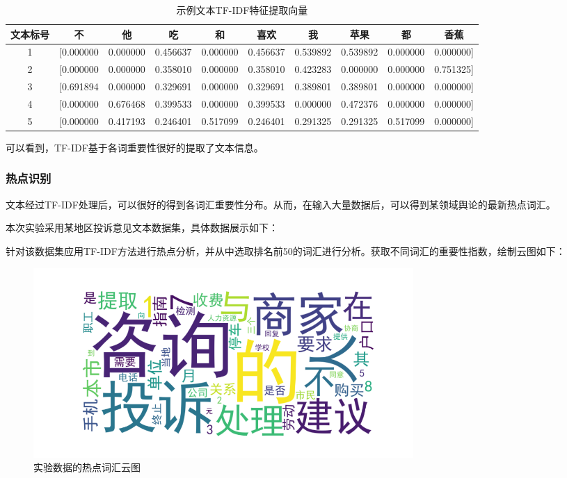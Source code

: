 \documentclass[UTF8,a4paper,15pt,titlepage,oneside]{ctexbook}
\begin{document}
  \begin{table}[H]
    \centering
    \begin{tabular}{cccccccccc}
    \toprule
    文本标号&不&他&吃&和&喜欢&我&苹果&都&香蕉\\
    \midrule
    1 & [0.000000 & 0.000000 & 0.456637 & 0.000000 & 0.456637 & 0.539892 & 0.539892 & 0.000000 & 0.000000]\\
    2 & [0.000000 & 0.000000 & 0.358010 & 0.000000 & 0.358010 & 0.423283 & 0.000000 & 0.000000 & 0.751325]\\
    3 & [0.691894 & 0.000000 & 0.329691 & 0.000000 & 0.329691 & 0.389801 & 0.389801 & 0.000000 & 0.000000]\\
    4 & [0.000000 & 0.676468 & 0.399533 & 0.000000 & 0.399533 & 0.000000 & 0.472376 & 0.000000 & 0.000000]\\
    5 & [0.000000 & 0.417193 & 0.246401 & 0.517099 & 0.246401 & 0.291325 & 0.291325 & 0.517099 & 0.000000]\\
    \bottomrule
    \end{tabular}
    \caption{示例文本TF-IDF特征提取向量}
    \end{table}

可以看到，TF-IDF基于各词重要性很好的提取了文本信息。

\subsubsection{热点识别}

文本经过TF-IDF处理后，可以很好的得到各词汇重要性分布。从而，在输入大量数据后，可以得到某领域舆论的最新热点词汇。

本次实验采用某地区投诉意见文本数据集，具体数据展示如下：



针对该数据集应用TF-IDF方法进行热点分析，并从中选取排名前50的词汇进行分析。获取不同词汇的重要性指数，绘制云图如下：

\begin{figure}[H]
  \centering
  \includegraphics[width=0.7\textwidth,keepaspectratio=false]{pictures/11.png} %
  \caption{实验数据的热点词汇云图}
\end{figure}
\end{document}
